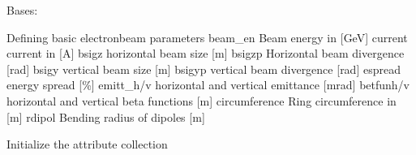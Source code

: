 \documentclass[letterpaper,10pt,english]{sphinxmanual}
\begin{document}

\begin{fulllineitems}
\label{\detokenize{autoapi/unduwave/index:unduwave.ebeam_parameters}}
\pysigstartsignatures
{}
\pysigstopsignatures
\sphinxAtStartPar
Bases: {\hyperref[\detokenize{autoapi/unduwave/attribute_classes/attributes/index:unduwave.attribute_classes.attributes._attribute_collection}]{}}

\sphinxAtStartPar
Defining basic electron\sphinxhyphen{}beam parameters
beam\_en \sphinxhyphen{} Beam energy in {[}GeV{]}
current \sphinxhyphen{} current in {[}A{]}
bsigz \sphinxhyphen{} horizontal beam size {[}m{]}
bsigzp \sphinxhyphen{} Horizontal beam divergence {[}rad{]}
bsigy \sphinxhyphen{} vertical beam size {[}m{]}
bsigyp \sphinxhyphen{} vertical beam divergence {[}rad{]}
espread \sphinxhyphen{} energy spread {[}\%{]}
emitt\_h/v \sphinxhyphen{} horizontal and vertical emittance {[}mrad{]}
betfunh/v \sphinxhyphen{} horizontal and vertical beta functions {[}m{]}
circumference \sphinxhyphen{} Ring circumference in {[}m{]}
rdipol \sphinxhyphen{} Bending radius of dipoles {[}m{]}

\sphinxAtStartPar
Initialize the attribute collection

\begin{fulllineitems}
\label{\detokenize{autoapi/unduwave/index:unduwave.ebeam_parameters.beam_en}}
\pysigstartsignatures
{}
\pysigstopsignatures
\end{fulllineitems}


\begin{fulllineitems}
\label{\detokenize{autoapi/unduwave/index:unduwave.ebeam_parameters.current}}
\pysigstartsignatures
{}
\pysigstopsignatures
\end{fulllineitems}


\end{fulllineitems}
\end{document}
